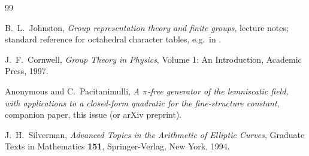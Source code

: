 \documentclass[11pt,reqno]{amsart}
\theoremstyle{plain}
\theoremstyle{definition}
\theoremstyle{remark}
\numberwithin{equation}{section}
\begin{document}
\begin{thebibliography}{99}

B.\ L.\ Johnston, \textit{Group representation theory and finite
groups}, lecture notes; standard reference for octahedral character
tables, e.g.\ in \cite[Chapter 9]{cornwell}.

J.\ F.\ Cornwell, \textit{Group Theory in Physics}, Volume 1: An
Introduction, Academic Press, 1997.

Anonymous and C.\ Pacitanimulli, \textit{A $\pi$-free
generator of the lemniscatic field, with applications to a
closed-form quadratic for the fine-structure constant}, companion
paper, this issue (or arXiv preprint).

J.\ H.\ Silverman, \textit{Advanced Topics in the Arithmetic of
Elliptic Curves}, Graduate Texts in Mathematics \textbf{151},
Springer-Verlag, New York, 1994.

\end{thebibliography}
\end{document}
